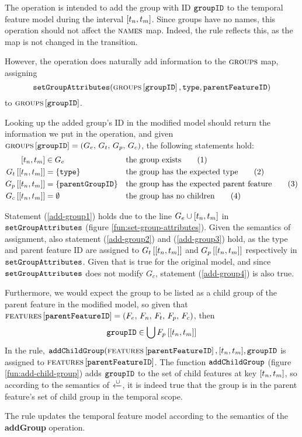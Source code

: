 The operation is intended to add the group with ID $\texttt{groupID}$ to the temporal feature model during the interval $\interval{t_n}{t_m}$. Since groups have no names, this operation should not affect the $\textsc{names}{}$ map. Indeed, the rule reflects this, as the map is not changed in the transition.

However, the operation does naturally add information to the $\textsc{groups}{}{}$ map, assigning
\begin{equation*}
   \texttt{setGroupAttributes}( \textsc{groups}{}{} \left[ \texttt{groupID} \right], \texttt{type}, 
   \texttt{parentFeatureID} )
\end{equation*}
to $\textsc{groups}{} \left[ \texttt{groupID} \right]$.

Looking up the added group's ID in the modified model should return the information we put in the operation, and given $\textsc{groups}{} \left[ \texttt{groupID} \right] = \left(G_e,\, G_t,\, G_p,\, G_c\right)$, the following statements hold:
\begin{align}
   \interval{t_n}{t_m} &\in G_e && \text{the group exists} \tag{1} \label{add-group1}\\
   \lookup{G_t}{\interval{t_n}{t_m}} &= \set{\var{type}}  && \text{the group has the expected type} \tag{2} \label{add-group2}\\
   \lookup{G_p}{\interval{t_n}{t_m}} &= \set{\var{parentGroupID}}  && \text{the group has the expected parent feature} \tag{3} \label{add-group3}\\
   \lookup{G_c}{\interval{t_n}{t_m}} &= \emptyset && \text{the group has no children} \tag{4} \label{add-group4}
\end{align}

Statement (\ref{add-group1}) holds due to the line $G_e \cup \interval{t_n}{t_m}$ in $\texttt{setGroupAttributes}$ (figure \vref{fun:set-group-attributes}). Given the semantics of assignment, also statement (\ref{add-group2}) and (\ref{add-group3}) hold, as the type and parent feature ID are assigned to $\lookup{G_t}{\interval{t_n}{t_m}}$ and $\lookup{G_p}{\interval{t_n}{t_m}}$ respectively in $\texttt{setGroupAttributes}$. Given that  is true for the original model, and since $\texttt{setGroupAttributes}$ does not modify $G_c$, statement (\ref{add-group4}) is also true.

Furthermore, we would expect the group to be listed as a child group of the parent feature in the modified model, so given that $\textsc{features}{} \left[ \texttt{parentFeatureID} \right] = \left(F_e,\, F_n,\, F_t,\, F_p,\, F_c\right)$, then
\begin{equation*}
   \var{groupID} \in \bigcup \lookup{F_p}{\interval{t_n}{t_m}}
\end{equation*}
In the  rule, $\var{addChildGroup}(\lookup{\features}{\var{parentFeatureID}}, \interval{t_n}{t_m}, \var{groupID}$ is assigned to $\textsc{features} \left[ \texttt{parentFeatureID} \right]$. The function $\texttt{addChildGroup}$ (figure \vref{fun:add-child-group}) adds $\texttt{groupID}$ to the set of child features at key $\interval{t_n}{t_m}$, so according to the semantics of $\xleftarrow{\cup}$, it is indeed true that the group is in the parent feature's set of child group in the temporal scope.
\\

\begin{lemma}
   The  rule updates the temporal feature model according to the semantics of the \textbf{addGroup} operation.
   \label{lemma:add-group-mod}
\end{lemma}


